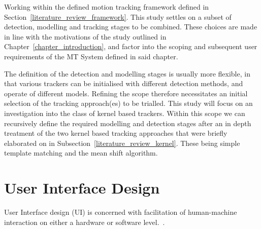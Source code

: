 Working within the defined motion tracking framework defined in
Section~\ref{literature_review_framework}. This study settles on a subset of
detection, modelling and tracking stages to be combined. These choices are made
in line with the motivations of the study outlined in
Chapter~\ref{chapter_introduction}, and factor into the scoping and subsequent user
requirements of the MT System defined in said chapter.

The definition of the detection and modelling stages is usually more flexible,
in that various trackers can be initialised with different detection methods,
and operate of different models. Refining the scope therefore necessitates an initial
selection of the tracking approach(es) to be trialled. 
This study will focus on an investigation into the class of kernel based
trackers. Within this scope we can recursively define the required modelling and
detection stages after an in depth treatment of the two kernel based tracking
approaches that were briefly elaborated on in
Subsection~\ref{literature_review_kernel}. These being simple template matching
and the mean shift algorithm. 


\section{User Interface Design}
User Interface design (UI) is concerned with facilitation of human-machine
interaction on either a hardware or software level.~\cite{wiki:uid,wiki:ui}.



